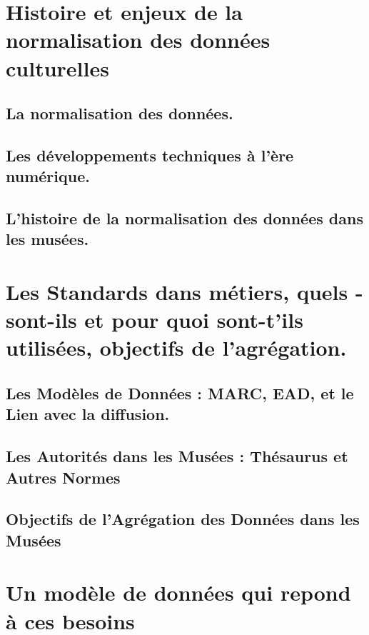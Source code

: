 \documentclass[a4paper,12pt,twoside]{book}
\begin{document}
	

	\part{Histoire et enjeux de la normalisation des données culturelles}

\chapter{La normalisation des données.}


\chapter{Les développements techniques à l’ère numérique.}


\chapter{L’histoire de la normalisation des données dans les musées.}



%

%
%	
	
	\part{Les Standards dans métiers, quels -sont-ils et pour quoi sont-t’ils utilisées, objectifs de l’agrégation.}
 \chapter{Les Modèles de Données : MARC, EAD, et le Lien avec la diffusion.}
 
 
 \chapter{ Les Autorités dans les Musées : Thésaurus et Autres Normes}
 
 
 \chapter{Objectifs de l'Agrégation des Données dans les Musées}
 
 

 \part{Un modèle de données qui repond à ces besoins 
}
\end{document}
